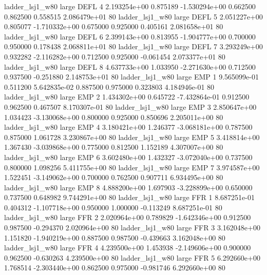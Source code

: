     ladder_lsj1_w80      large     DEFL                 4 2.193254e+00      0.875189 -1.530294e+00 0.662500 0.862500       0.558515 2.086479e+01 80
    ladder_lsj1_w80      large     DEFL                 5 2.051227e+00      0.805077 -1.710332e+00 0.675000 0.925000       0.405161 2.081658e+01 80
    ladder_lsj1_w80      large     DEFL                 6 2.399143e+00      0.813955 -1.904777e+00 0.700000 0.950000       0.178438 2.068811e+01 80
    ladder_lsj1_w80      large     DEFL                 7 3.293249e+00      0.932282 -2.116282e+00 0.712500 0.925000      -0.061454 2.073377e+01 80
    ladder_lsj1_w80      large     DEFL                 8 4.637733e+00      1.033950 -2.271630e+00 0.712500 0.937500      -0.251880 2.148753e+01 80
    ladder_lsj1_w80      large      EMP                 1 9.565099e-01      0.511200  5.642835e-02 0.887500 0.975000       0.323803 4.184946e-01 80
    ladder_lsj1_w80      large      EMP                 2 1.434302e+00      0.645722 -7.432864e-01 0.912500 0.962500       0.467507 8.170307e-01 80
    ladder_lsj1_w80      large      EMP                 3 2.850647e+00      1.034423 -3.130068e+00 0.800000 0.925000       0.850696 2.205011e+00 80
    ladder_lsj1_w80      large      EMP                 4 3.180421e+00      1.246377 -3.068181e+00 0.787500 0.875000       1.061728 3.230867e+00 80
    ladder_lsj1_w80      large      EMP                 5 3.418814e+00      1.367430 -3.039868e+00 0.775000 0.812500       1.152189 4.307007e+00 80
    ladder_lsj1_w80      large      EMP                 6 3.602480e+00      1.432327 -3.072040e+00 0.737500 0.800000       1.098256 5.411755e+00 80
    ladder_lsj1_w80      large      EMP                 7 3.974587e+00      1.522451 -3.149062e+00 0.700000 0.762500       0.907711 6.934495e+00 80
    ladder_lsj1_w80      large      EMP                 8 4.888200e+00      1.697903 -3.228899e+00 0.650000 0.737500       0.648982 9.744291e+00 80
    ladder_lsj1_w80      large      FFR                 1 8.687251e-01      0.404312 -1.107718e+00 0.950000 1.000000      -0.113249 8.687251e-01 80
    ladder_lsj1_w80      large      FFR                 2 2.020964e+00      0.789829 -1.642346e+00 0.912500 0.987500      -0.294370 2.020964e+00 80
    ladder_lsj1_w80      large      FFR                 3 3.162048e+00      1.151820 -1.940219e+00 0.887500 0.987500      -0.439663 3.162048e+00 80
    ladder_lsj1_w80      large      FFR                 4 4.239500e+00      1.453938 -2.149606e+00 0.900000 0.962500      -0.630263 4.239500e+00 80
    ladder_lsj1_w80      large      FFR                 5 6.292660e+00      1.768514 -2.303440e+00 0.862500 0.975000      -0.981746 6.292660e+00 80
